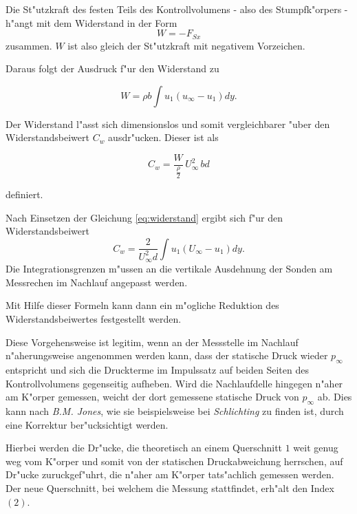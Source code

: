 Die St"utzkraft des festen Teils des Kontrollvolumens - also des Stumpfk"orpers - h"angt mit dem Widerstand in der Form
\begin{equation}
	\label{eq:W=-F_Sx}
	W = - F_{Sx}
\end{equation}
zusammen. 
$W$ ist also gleich der St"utzkraft mit negativem Vorzeichen.

Daraus folgt der Ausdruck f"ur den Widerstand zu
\begin{center}
	\begin{equation}
		\label{eq:widerstand}
		W = \rho b \int u_{1} (u_{\infty}- u_{1}) dy.
	\end{equation}
\end{center}

Der Widerstand l"asst sich dimensionslos und somit vergleichbarer "uber den Widerstandsbeiwert $C_w$ ausdr"ucken. Dieser ist als 
\begin{center}
	\begin{equation}
		\label{eq:def-c_w}
		C_w = \frac{W}{\frac{\rho}{2}}\, U_{\infty}^2 \, bd
	\end{equation}
\end{center}
definiert.

Nach Einsetzen der Gleichung \ref{eq:widerstand} ergibt sich f"ur den Widerstandsbeiwert
\begin{equation}
	\label{eq:Bestimmungsgleichung C_w}
	C_w = \frac{2}{U_{\infty}^2 d} \int u_{1}(U_{\infty} - u_{1}) dy.
\end{equation}
Die Integrationsgrenzen m"ussen an die vertikale Ausdehnung der Sonden am Messrechen im Nachlauf angepasst werden.	

Mit Hilfe dieser Formeln kann dann ein m"ogliche Reduktion des Widerstandsbeiwertes festgestellt werden.

Diese Vorgehensweise ist legitim, wenn an der Messstelle im Nachlauf n"aherungsweise angenommen werden kann, dass der statische Druck wieder $p_\infty$ entspricht und sich die Druckterme im Impulssatz auf  beiden Seiten des Kontrollvolumens gegenseitig aufheben.
Wird die Nachlaufdelle hingegen n"aher am K"orper gemessen, weicht der dort gemessene statische Druck von $p_{\infty}$ ab. Dies  kann nach \textit{B.M. Jones}, wie sie beispielsweise bei \textit{Schlichting} \cite{Schlichting.2001} zu finden ist, durch eine Korrektur ber"ucksichtigt werden.

Hierbei werden die Dr"ucke, die theoretisch an einem Querschnitt $1$ weit genug weg vom K"orper und somit von der statischen Druckabweichung herrschen, auf Dr"ucke zuruckgef"uhrt, die n"aher am K"orper tats"achlich gemessen werden.
Der neue Querschnitt, bei welchem die Messung stattfindet, erh"alt den Index $(2)$.

